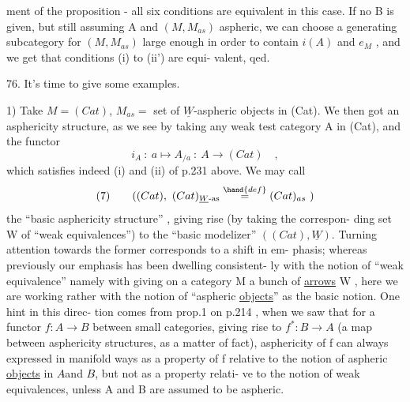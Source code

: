 
ment of the proposition - all six conditions are equivalent in this case.
If no B is given, but still assuming A and $(M,M_{as})$ aspheric, we can
choose a generating subcategory for $(M,M_{as})$ large enough in order to
contain $i(A)$ and $e_M$ , and we get that conditions (i) to (ii') are equi-%
valent, qed.

76. It's time to give some examples.

1) Take $M = (Cat)$, $M_{as} =$ set of $\underline{W}$-aspheric objects in (Cat). We
then got an asphericity structure, as we see by taking any weak test
category A in (Cat), and the functor
\[ i_A \ : \ a \longmapsto A_{/a} \ : \ A \longrightarrow (Cat) \quad , \]
which satisfies indeed (i) and (ii) of p.231 above.\margin{//} We may call
\[ (7) \qquad ((Cat),\ (Cat)_{\underline{W}\text{-as}} \overset{\hand{def}}{=} (Cat)_{as} \ ) \]
the ``basic asphericity structure'' , giving rise (by taking the correspon-%
ding set W of ``weak equivalences'') to the ``basic modelizer''\deleted{\unsure{,}} $((Cat), \underline{W})$.
Turning attention  towards the former corresponds to a shift in em-%
phasis; whereas previously our emphasis has  been dwelling consistent-%
ly with the notion of ``weak equivalence''\hand{,} namely with  giving on a
category M a bunch of \uline{arrows} W , here we are  working rather with the
notion of ``aspheric \uline{objects}'' as the basic notion. One hint in this direc-%
tion comes from prop.1  on p.214 , when we saw that for a functor
$f\colon A \longrightarrow B$ between small categories, giving rise to $f^{*}\colon B\hat{} \longrightarrow A\hat{}$ (a map
 between asphericity structures, as a matter of fact), asphericity of f
can  always expressed in manifold ways as a property of f relative to
the notion of aspheric \uline{objects} in $A\hat{}$and $B\hat{}$, but not as a property relati-%
ve to the notion of weak equivalences, unless A and B are assumed to be
aspheric.

